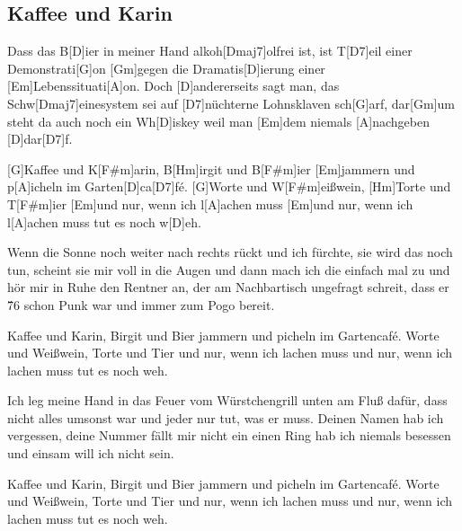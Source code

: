 \subsection*{Kaffee und Karin   }
\begin{guitar}
Dass das B[D]ier in meiner Hand alkoh[Dmaj7]olfrei ist,
ist T[D7]eil einer Demonstrati[G]on
[Gm]gegen die Dramatis[D]ierung einer [Em]Lebenssituati[A]on.
Doch [D]andererseits sagt man, das Schw[Dmaj7]einesystem
sei auf [D7]nüchterne Lohnsklaven sch[G]arf,
dar[Gm]um steht da auch noch ein Wh[D]iskey
weil man [Em]dem niemals [A]nachgeben [D]dar[D7]f.



[G]Kaffee und K[F#m]arin, B[Hm]irgit und B[F#m]ier
[Em]jammern und p[A]icheln im Garten[D]ca[D7]fé.
[G]Worte und W[F#m]eißwein, [Hm]Torte und T[F#m]ier
[Em]und nur, wenn ich l[A]achen muss
[Em]und nur, wenn ich l[A]achen muss
tut es noch w[D]eh. 



Wenn die Sonne noch weiter nach rechts rückt
und ich fürchte, sie wird das noch tun,
scheint sie mir voll in die Augen
und dann mach ich die einfach mal zu
und hör mir in Ruhe den Rentner an,
der am Nachbartisch ungefragt schreit,
dass er \'76 schon Punk war und immer zum Pogo bereit.



Kaffee und Karin, Birgit und Bier
jammern und picheln im Gartencafé.
Worte und Weißwein, Torte und Tier
und nur, wenn ich lachen muss
und nur, wenn ich lachen muss
tut es noch weh.



Ich leg meine Hand in das Feuer
vom Würstchengrill unten am Fluß
dafür, dass nicht alles umsonst war
und jeder nur tut, was er muss.
Deinen Namen hab ich vergessen,
deine Nummer fällt mir nicht ein
einen Ring hab ich niemals besessen
und einsam will ich nicht sein.



Kaffee und Karin, Birgit und Bier
jammern und picheln im Gartencafé.
Worte und Weißwein, Torte und Tier
und nur, wenn ich lachen muss
und nur, wenn ich lachen muss
tut es noch weh. 
\end{guitar}
